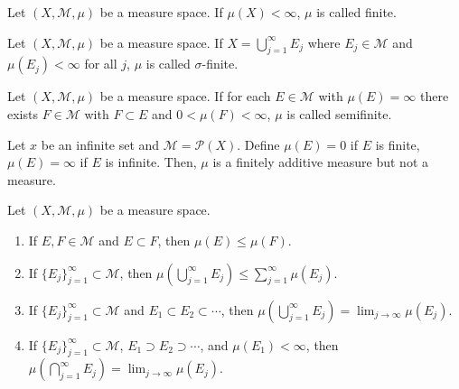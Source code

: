 \begin{definition}
    Let $(X, \mathcal{M}, \mu)$ be a measure space.
    If $\mu(X) < \infty$, $\mu$ is called finite.
\end{definition}

\begin{definition}
    Let $(X, \mathcal{M}, \mu)$ be a measure space.
    If $X = \bigcup_{j=1}^{\infty} E_j$ where $E_j \in \mathcal{M}$ and $\mu(E_j) < \infty$ for all $j$, $\mu$ is called $\sigma$-finite.
\end{definition}

\begin{definition}
    Let $(X, \mathcal{M}, \mu)$ be a measure space.
    If for each $E \in \mathcal{M}$ with $\mu(E) = \infty$ there exists $F \in \mathcal{M}$ with $F \subset E$ and $0 < \mu(F) < \infty$, $\mu$ is called semifinite.
\end{definition}

\begin{example}
    Let $x$ be an infinite set and $\mathcal{M} = \mathcal{P}(X)$.
    Define $\mu(E) = 0$ if $E$ is finite, $\mu(E) = \infty$ if $E$ is infinite.
    Then, $\mu$ is a finitely additive measure but not a measure.
\end{example}

\begin{theorem}
    Let $(X, \mathcal{M}, \mu)$ be a measure space.
    \begin{enumerate}
        \item If $E, F \in \mathcal{M}$ and $E \subset F$, then $\mu(E) \le \mu(F)$.
        \item If $\{ E_{j} \}_{j=1}^{\infty} \subset \mathcal{M}$, then $\mu(\bigcup_{j=1}^{\infty} E_j) \le \sum _{j=1}^{\infty} \mu(E_j)$.
        \item If $\{ E_{j} \}_{j=1}^{\infty} \subset \mathcal{M}$ and $E_1 \subset E_2 \subset \cdots$, then $\mu(\bigcup_{j=1}^{\infty} E_j) = \lim_{j\to \infty} \mu(E_j)$.
        \item If $\{ E_{j} \}_{j=1}^{\infty} \subset \mathcal{M}$, $E_1 \supset E_2 \supset \cdots$, and $\mu(E_1) < \infty$, then $\mu(\bigcap_{j=1}^{\infty} E_j) = \lim_{j\to \infty} \mu(E_j)$.
    \end{enumerate}
\end{theorem}

